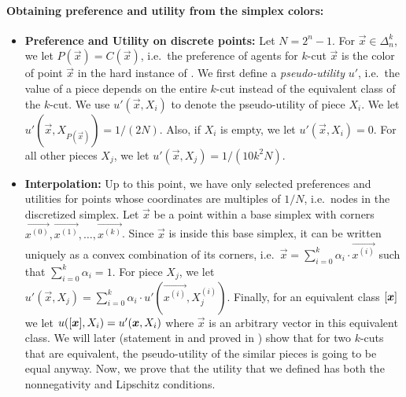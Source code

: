 \paragraph{Obtaining preference and utility from the simplex colors:} 
\begin{itemize}
    \item \textbf{Preference and Utility on discrete points:} Let $N = 2^n - 1$. For $\vec{x} \in \Delta^k_n$, we let $P(\vec{x}) = C(\vec{x})$, i.e.~the preference of agents for $k$-cut $\vec{x}$ is the color of point $\vec{x}$ in the hard instance of .  We first define a {\em pseudo-utility} $u'$, i.e.~the value of a piece depends on the entire $k$-cut instead of the equivalent class of the $k$-cut. We use $u'(\vec{x}, X_i)$ to denote the pseudo-utility of piece $X_i$. We let $u'(\vec{x}, X_{P(\vec{x})}) = 1/(2N)$. Also, if $X_i$ is empty, we let $u'(\vec{x}, X_i) = 0$. For all other pieces $X_j$, we let $u'(\vec{x}, X_j) = 1/(10k^2N)$. 
    \item \textbf{Interpolation:} Up to this point, we have only selected preferences and utilities for points whose coordinates are multiples of $1/N$, i.e.~nodes in the discretized simplex. Let $\vec{x}$ be a point within a base simplex with corners $\vec{x^{(0)}}, \vec{x^{(1)}}, \ldots, \vec{x^{(k)}}$. Since $\vec{x}$ is inside this base simplex, it can be written uniquely as a convex combination of its corners, i.e.~$\vec{x} = \sum_{i=0}^k \alpha_i \cdot \vec{x^{(i)}}$ such that $\sum_{i=0}^k \alpha_i = 1$. For piece $X_j$, we let $u'(\vec{x}, X_j) = \sum_{i=0}^k \alpha_i \cdot u'(\vec{x^{(i)}}, X^{(i)}_j)$. Finally, for an equivalent class $[\boldsymbol{x}]$ we let $u([\boldsymbol{x}], X_i) = u'(\boldsymbol{x}, X_i)$ where $\vec{x}$ is an arbitrary vector in this equivalent class. We will later (statement in  and proved in ) show that for two $k$-cuts that are equivalent, the pseudo-utility of the similar pieces is going to be equal anyway. 
Now, we prove that the utility that we defined has both the nonnegativity and Lipschitz conditions.
\end{itemize}
 



